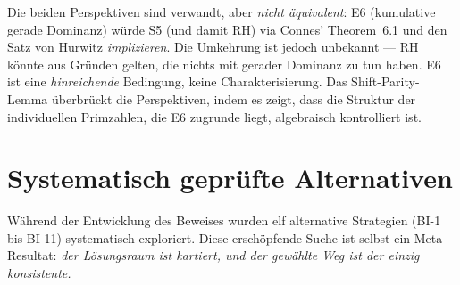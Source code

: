 \documentclass[12pt,a4paper]{article}
\theoremstyle{definition}
\theoremstyle{remark}
\begin{document}
\begin{center}
\renewcommand{\arraystretch}{1.2}
\end{center}

\noindent Die beiden Perspektiven sind verwandt, aber \emph{nicht äquivalent}: E6 (kumulative gerade Dominanz) würde S5 (und damit RH) via Connes' Theorem~6.1 und den Satz von Hurwitz \emph{implizieren}. Die Umkehrung ist jedoch unbekannt --- RH könnte aus Gründen gelten, die nichts mit gerader Dominanz zu tun haben. E6 ist eine \emph{hinreichende} Bedingung, keine Charakterisierung. Das Shift-Parity-Lemma überbrückt die Perspektiven, indem es zeigt, dass die Struktur der individuellen Primzahlen, die E6 zugrunde liegt, algebraisch kontrolliert ist.


\needspace{8cm}
\section{Systematisch geprüfte Alternativen}
\label{sec:explored-alternatives}

Während der Entwicklung des Beweises wurden elf alternative Strategien (BI-1 bis BI-11) systematisch exploriert. Diese erschöpfende Suche ist selbst ein Meta-Resultat: \emph{der Lösungsraum ist kartiert, und der gewählte Weg ist der einzig konsistente.}
\end{document}
